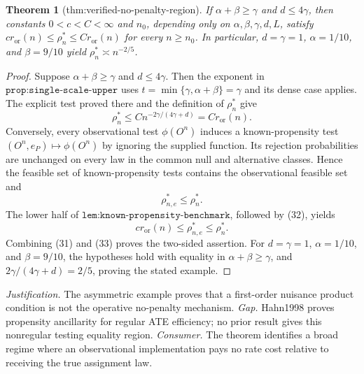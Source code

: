 \documentclass{article}
\newtheorem{theorem}{Theorem}
\begin{document}
\begin{theorem}[thm:verified-no-penalty-region]\label{thm:verified-no-penalty-region}
If \(\alpha+\beta\ge\gamma\) and \(d\le4\gamma\), then constants \(0<c<C<\infty\) and \(n_0\), depending only on \(\alpha,\beta,\gamma,d,L\), satisfy \(c r_{\mathrm{or}}(n)\le\rho_n^*\le C r_{\mathrm{or}}(n)\) for every \(n\ge n_0\). In particular, \(d=\gamma=1\), \(\alpha=1/10\), and \(\beta=9/10\) yield \(\rho_n^*\asymp n^{-2/5}\).
\end{theorem}
\begin{proof}
Suppose \(\alpha+\beta\ge\gamma\) and \(d\le4\gamma\). Then the exponent in \(\texttt{prop:single-scale-upper}\) uses \(t=\min\{\gamma,\alpha+\beta\}=\gamma\) and its dense case applies. The explicit test proved there and the definition of \(\rho_n^*\) give
\[
 \rho_n^*\le C n^{-2\gamma/(4\gamma+d)}=C r_{\mathrm{or}}(n).        \tag{31}
\]
Conversely, every observational test \(\phi(O^n)\) induces a known-propensity test \((O^n,e_P)\mapsto\phi(O^n)\) by ignoring the supplied function. Its rejection probabilities are unchanged on every law in the common null and alternative classes. Hence the feasible set of known-propensity tests contains the observational feasible set and
\[
 \rho_{n,e}^*\le\rho_n^*.                                           \tag{32}
\]
The lower half of \(\texttt{lem:known-propensity-benchmark}\), followed by (32), yields
\[
 c r_{\mathrm{or}}(n)\le\rho_{n,e}^*\le\rho_n^*.                    \tag{33}
\]
Combining (31) and (33) proves the two-sided assertion. For \(d=\gamma=1\), \(\alpha=1/10\), and \(\beta=9/10\), the hypotheses hold with equality in \(\alpha+\beta\ge\gamma\), and \(2\gamma/(4\gamma+d)=2/5\), proving the stated example.
\end{proof}
\par\smallskip\noindent \textit{Justification.} The asymmetric example proves that a first-order nuisance product condition is not the operative no-penalty mechanism. \textit{Gap.} Hahn1998 proves propensity ancillarity for regular ATE efficiency; no prior result gives this nonregular testing equality region. \textit{Consumer.} The theorem identifies a broad regime where an observational implementation pays no rate cost relative to receiving the true assignment law.
\end{document}
